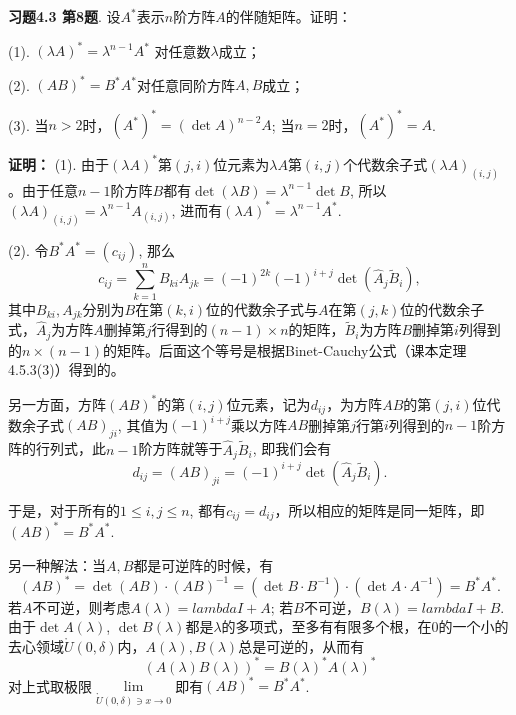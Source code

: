 
\renewcommand{\newpageorvspace}{\vspace{2em}}

\date{2021-11-26  第五次习题课}



\maketitle

{\bf 习题4.3 第8题}. 设$A^*$表示$n$阶方阵$A$的伴随矩阵。证明：

(1). $(\lambda A)^* = \lambda^{n-1}A^*$ 对任意数$\lambda$成立；

(2). $(AB)^* = B^*A^*$对任意同阶方阵$A,B$成立；

(3). 当$n > 2$时，$(A^*)^* = (\det A)^{n-2}A$; 当$n = 2$时，$(A^*)^* = A$.

{\bf 证明：} (1). 由于$(\lambda A)^*$第$(j,i)$位元素为$\lambda A$第$(i,j)$个代数余子式$(\lambda A)_{(i,j)}$。由于任意$n-1$阶方阵$B$都有$\det(\lambda B) = \lambda^{n-1}\det B$, 所以$(\lambda A)_{(i,j)} = \lambda^{n-1} A_{(i,j)}$, 进而有$(\lambda A)^* = \lambda^{n-1}A^*$.

(2). 令$B^*A^* = (c_{ij})$, 那么
$$c_{ij} = \sum\limits_{k=1}^n B_{ki} A_{jk} = (-1)^{2k}(-1)^{i+j} \det(\widehat{A}_j \widetilde{B}_i),$$
其中$B_{ki}, A_{jk}$分别为$B$在第$(k,i)$位的代数余子式与$A$在第$(j,k)$位的代数余子式，$\widehat{A}_j$为方阵$A$删掉第$j$行得到的$(n-1)\times n$的矩阵，$\widetilde{B}_i$为方阵$B$删掉第$i$列得到的$n\times (n-1)$的矩阵。后面这个等号是根据Binet-Cauchy公式（课本定理4.5.3(3)）得到的。

另一方面，方阵$(AB)^*$的第$(i,j)$位元素，记为$d_{ij}$，为方阵$AB$的第$(j,i)$位代数余子式$(AB)_{ji}$, 其值为$(-1)^{i+j}$乘以方阵$AB$删掉第$j$行第$i$列得到的$n-1$阶方阵的行列式，此$n-1$阶方阵就等于$\widehat{A}_j \widetilde{B}_i$, 即我们会有
$$d_{ij} = (AB)_{ji} = (-1)^{i+j} \det(\widehat{A}_j \widetilde{B}_i).$$

于是，对于所有的$1\leqslant i,j \leqslant n$, 都有$c_{ij} = d_{ij}$，所以相应的矩阵是同一矩阵，即$(AB)^* = B^*A^*$.

另一种解法：当$A,B$都是可逆阵的时候，有
$$(AB)^* = \det(AB) \cdot (AB)^{-1} = (\det B \cdot B^{-1}) \cdot (\det A \cdot A^{-1}) = B^*A^*.$$
若$A$不可逆，则考虑$A(\lambda) = lambda I + A$; 若$B$不可逆，$B(\lambda) = lambda I + B$. 由于$\det A(\lambda)$, $\det B(\lambda)$都是$\lambda$的多项式，至多有有限多个根，在$0$的一个小的去心领域$\mathring{U}(0,\delta)$内，$A(\lambda), B(\lambda)$总是可逆的，从而有
$$(A(\lambda)B(\lambda))^* = B(\lambda)^*A(\lambda)^*$$
对上式取极限$\lim\limits_{\mathring{U}(0,\delta) \ni x\to 0}$即有$(AB)^* = B^*A^*$.

